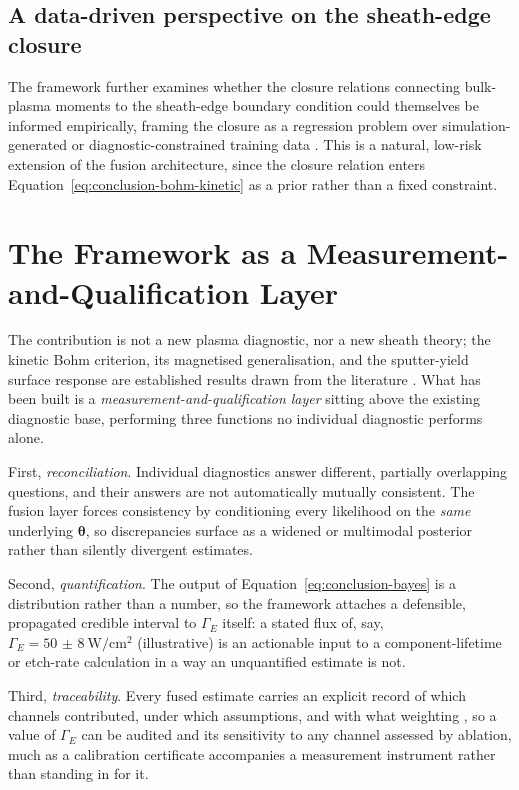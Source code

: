\subsection{A data-driven perspective on the sheath-edge closure}
\label{ssec:conclusion-datadriven}

The framework further examines whether the closure relations connecting bulk-plasma moments to the sheath-edge boundary condition could themselves be informed empirically, framing the closure as a regression problem over simulation-generated or diagnostic-constrained training data \cite{ref0101}. This is a natural, low-risk extension of the fusion architecture, since the closure relation enters Equation~\eqref{eq:conclusion-bohm-kinetic} as a prior rather than a fixed constraint.

\section{The Framework as a Measurement-and-Qualification Layer}
\label{sec:conclusion-framework}

The contribution is not a new plasma diagnostic, nor a new sheath theory; the kinetic Bohm criterion, its magnetised generalisation, and the sputter-yield surface response are established results drawn from the literature \cite{ref0001,ref0013,ref0017,ref0093}. What has been built is a \emph{measurement-and-qualification layer} sitting above the existing diagnostic base, performing three functions no individual diagnostic performs alone.

First, \emph{reconciliation}. Individual diagnostics answer different, partially overlapping questions, and their answers are not automatically mutually consistent. The fusion layer forces consistency by conditioning every likelihood on the \emph{same} underlying $\boldsymbol{\theta}$, so discrepancies surface as a widened or multimodal posterior rather than silently divergent estimates.

Second, \emph{quantification}. The output of Equation~\eqref{eq:conclusion-bayes} is a distribution rather than a number, so the framework attaches a defensible, propagated credible interval to $\Gamma_{E}$ itself: a stated flux of, say, $\Gamma_{E} = \SI{50(8)}{\watt\per\centi\meter\squared}$ (illustrative) is an actionable input to a component-lifetime or etch-rate calculation in a way an unquantified estimate is not.

Third, \emph{traceability}. Every fused estimate carries an explicit record of which channels contributed, under which assumptions, and with what weighting \cite{ref0707,ref0711}, so a value of $\Gamma_{E}$ can be audited and its sensitivity to any channel assessed by ablation, much as a calibration certificate accompanies a measurement instrument rather than standing in for it.

